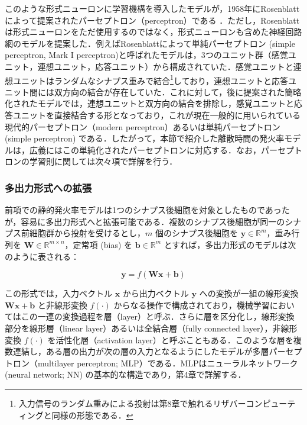 \documentclass[titlepage]{ltjsbook}
\begin{document}
このような形式ニューロンに学習機構を導入したモデルが，1958年にRosenblattによって提案されたパーセプトロン（perceptron）である \citep{rosenblatt1958perceptron}．ただし，Rosenblattは形式ニューロンをただ使用するのではなく，形式ニューロンも含めた神経回路網のモデルを提案した．例えばRosenblattによって単純パーセプトロン (simple perceptron, Mark I perceptron)と呼ばれたモデルは，3つのユニット群（感覚ユニット，連想ユニット，応答ユニット）から構成されていた．感覚ユニットと連想ユニットはランダムなシナプス重みで結合\footnote{入力信号のランダム重みによる投射は第8章で触れるリザバーコンピューティングと同様の形態である．}しており，連想ユニットと応答ユニット間には双方向の結合が存在していた．これに対して，後に提案された簡略化されたモデルでは，連想ユニットと双方向の結合を排除し，感覚ユニットと応答ユニットを直接結合する形となっており，これが現在一般的に用いられている現代的パーセプトロン（modern perceptron）あるいは単純パーセプトロン (simple perceptron) である．したがって，本節で紹介した離散時間の発火率モデルは，広義にはこの単純化されたパーセプトロンに対応する．なお，パーセプトロンの学習則に関しては次々項で詳解を行う．

\subsubsection{多出力形式への拡張}
前項での静的発火率モデルは1つのシナプス後細胞を対象としたものであったが，容易に多出力形式へと拡張可能である．複数のシナプス後細胞が同一のシナプス前細胞群から投射を受けるとし，$m$ 個のシナプス後細胞を $\mathbf{y} \in \mathbb{R}^m$，重み行列を $\mathbf{W} \in \mathbb{R}^{m \times n}$，定常項 (bias) を $\mathbf{b} \in \mathbb{R}^m$ とすれば，多出力形式のモデルは次のように表される：

\begin{equation}
\mathbf{y} = f(\mathbf{W} \mathbf{x} + \mathbf{b})
\end{equation}

この形式では，入力ベクトル $\mathbf{x}$ から出力ベクトル $\mathbf{y}$ への変換が一組の線形変換 $\mathbf{W}\mathbf{x} + \mathbf{b}$ と非線形変換 $f(\cdot)$ からなる操作で構成されており，機械学習においてはこの一連の変換過程を層（layer）と呼ぶ．さらに層を区分化し，線形変換部分を線形層（linear layer）あるいは全結合層（fully connected layer），非線形変換 $f(\cdot)$ を活性化層（activation layer）と呼ぶこともある．このような層を複数連結し，ある層の出力が次の層の入力となるようにしたモデルが多層パーセプトロン（multilayer perceptron; MLP）である．MLPはニューラルネットワーク (neural network; NN) の基本的な構造であり，第4章で詳解する．
\end{document}
